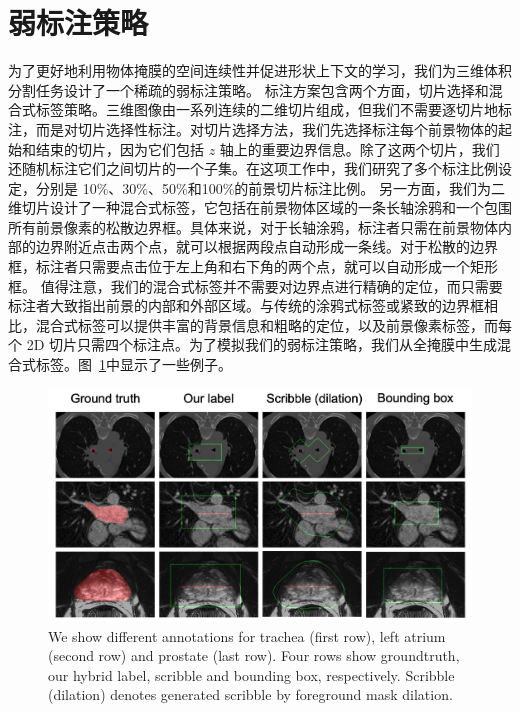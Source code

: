 \section{弱标注策略}
为了更好地利用物体掩膜的空间连续性并促进形状上下文的学习，我们为三维体积分割任务设计了一个稀疏的弱标注策略。
标注方案包含两个方面，切片选择和混合式标签策略。三维图像由一系列连续的二维切片组成，但我们不需要逐切片地标注，而是对切片选择性标注。对切片选择方法，我们先选择标注每个前景物体的起始和结束的切片，因为它们包括 $z$ 轴上的重要边界信息。除了这两个切片，我们还随机标注它们之间切片的一个子集。在这项工作中，我们研究了多个标注比例设定，分别是 10\%、30\%、50\%和100\%的前景切片标注比例。
另一方面，我们为二维切片设计了一种混合式标签，它包括在前景物体区域的一条长轴涂鸦和一个包围所有前景像素的松散边界框。具体来说，对于长轴涂鸦，标注者只需在前景物体内部的边界附近点击两个点，就可以根据两段点自动形成一条线。对于松散的边界框，标注者只需要点击位于左上角和右下角的两个点，就可以自动形成一个矩形框。
值得注意，我们的混合式标签并不需要对边界点进行精确的定位，而只需要标注者大致指出前景的内部和外部区域。与传统的涂鸦式标签或紧致的边界框相比，混合式标签可以提供丰富的背景信息和粗略的定位，以及前景像素标签，而每个 2D 切片只需四个标注点。为了模拟我们的弱标注策略，我们从全掩膜中生成混合式标签。图~\ref{fig:weak_annotation}中显示了一些例子。

    \begin{figure}[tbp]
        \centering 
        \includegraphics[width=1.0\textwidth]{img/c3/c_weak_annotation2.png}
        {We show different annotations for trachea (first row), left atrium (second row) and prostate (last row). Four rows show groundtruth, our hybrid label, scribble and bounding box, respectively. Scribble (dilation) denotes generated scribble by foreground mask dilation.}
        \label{fig:weak_annotation}
    \end{figure}

